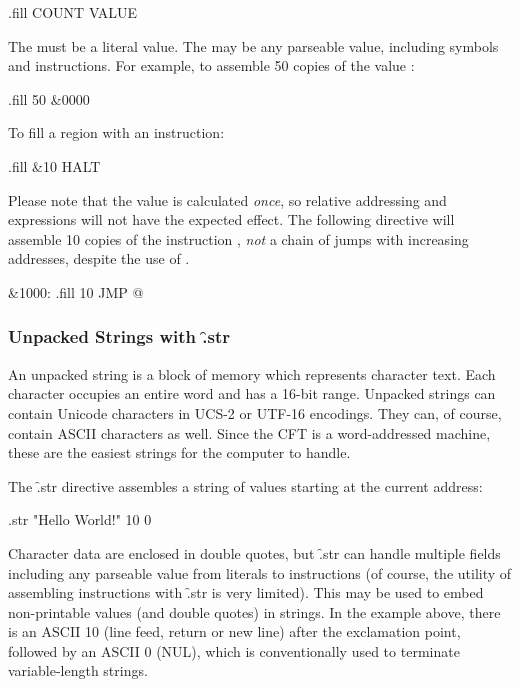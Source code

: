 \begin{cftasmcode}
.fill COUNT VALUE
\end{cftasmcode}

The  must be a literal value. The  may be any parseable
value, including symbols and instructions. For example, to assemble 50 copies
of the value :

\begin{cftasmcode}
.fill 50 &0000
\end{cftasmcode}

To fill a region with an instruction:

\begin{cftasmcode}
.fill &10 HALT
\end{cftasmcode}

Please note that the value is calculated {\em once}, so relative addressing and
expressions will not have the expected effect. The following directive will
assemble 10 copies of the instruction , {\em not\/} a chain of jumps
with increasing addresses, despite the use of .

\begin{cftasmcode}
&1000:  .fill 10 JMP @
\end{cftasmcode}



\subsubsection{Unpacked Strings with \f{.str}}

An unpacked string is a block of memory which represents character text. Each
character occupies an entire word and has a 16-bit range. Unpacked strings can
contain Unicode characters in UCS-2 or UTF-16 encodings. They can, of course,
contain ASCII characters as well. Since the CFT is a word-addressed machine,
these are the easiest strings for the computer to handle.

The \f{.str} directive assembles a string of values starting at the current
address:

\begin{cftasmcode}
.str "Hello World!" 10 0
\end{cftasmcode}

Character data are enclosed in double quotes, but \f{.str} can handle multiple
fields including any parseable value from literals to instructions (of course,
the utility of assembling instructions with \f{.str} is very limited). This may
be used to embed non-printable values (and double quotes) in strings. In the
example above, there is an ASCII 10 (line feed, return or new line) after the
exclamation point, followed by an ASCII 0 (NUL), which is conventionally used
to terminate variable-length strings.

